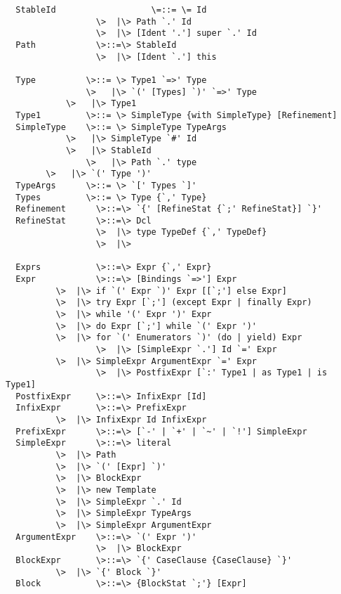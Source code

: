 \documentclass[11pt]{report}
\begin{document}
\begin{verbatim}
  StableId                   \=::= \= Id
                  \>  |\> Path `.' Id
                  \>  |\> [Ident '.'] super `.' Id
  Path            \>::=\> StableId
                  \>  |\> [Ident `.'] this

  Type          \>::= \> Type1 `=>' Type
                \>   |\> `(' [Types] `)' `=>' Type
	        \>   |\> Type1
  Type1         \>::= \> SimpleType {with SimpleType} [Refinement]
  SimpleType   	\>::= \> SimpleType TypeArgs
	        \>   |\> SimpleType `#' Id
	        \>   |\> StableId
                \>   |\> Path `.' type
		\>   |\> `(' Type ')'
  TypeArgs     	\>::= \> `[' Types `]'
  Types         \>::= \> Type {`,' Type}
  Refinement      \>::=\> `{' [RefineStat {`;' RefineStat}] `}'
  RefineStat      \>::=\> Dcl
                  \>  |\> type TypeDef {`,' TypeDef}
                  \>  |\>

  Exprs           \>::=\> Expr {`,' Expr}
  Expr            \>::=\> [Bindings `=>'] Expr
		  \>  |\> if `(' Expr `)' Expr [[`;'] else Expr]
		  \>  |\> try Expr [`;'] (except Expr | finally Expr)
		  \>  |\> while '(' Expr ')' Expr
		  \>  |\> do Expr [`;'] while `(' Expr ')'
		  \>  |\> for `(' Enumerators `)' (do | yield) Expr
                  \>  |\> [SimpleExpr `.'] Id `=' Expr
		  \>  |\> SimpleExpr ArgumentExpr `=' Expr
                  \>  |\> PostfixExpr [`:' Type1 | as Type1 | is Type1]
  PostfixExpr     \>::=\> InfixExpr [Id]
  InfixExpr       \>::=\> PrefixExpr
		  \>  |\> InfixExpr Id InfixExpr
  PrefixExpr      \>::=\> [`-' | `+' | `~' | `!'] SimpleExpr 
  SimpleExpr      \>::=\> literal
		  \>  |\> Path
		  \>  |\> `(' [Expr] `)'
		  \>  |\> BlockExpr
		  \>  |\> new Template 
		  \>  |\> SimpleExpr `.' Id 
		  \>  |\> SimpleExpr TypeArgs
		  \>  |\> SimpleExpr ArgumentExpr
  ArgumentExpr    \>::=\> `(' Expr ')'
                  \>  |\> BlockExpr
  BlockExpr       \>::=\> `{' CaseClause {CaseClause} `}'
		  \>  |\> `{' Block `}'
  Block           \>::=\> {BlockStat `;'} [Expr]
\end{verbatim}
\end{document}

